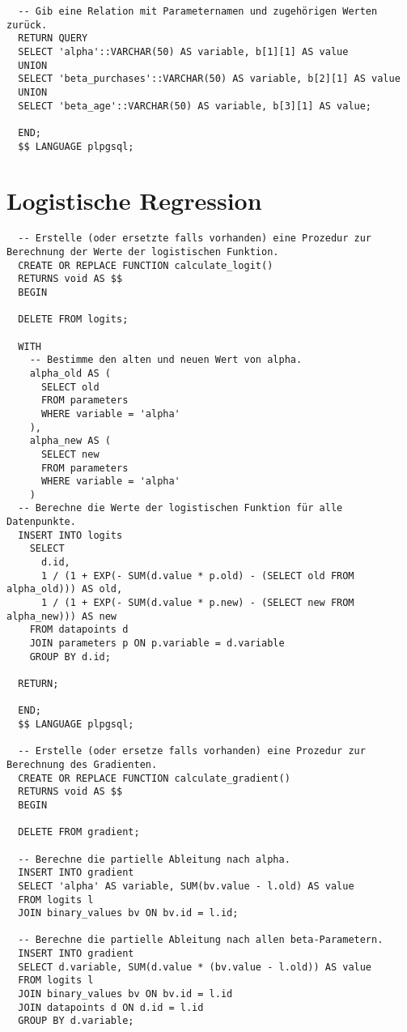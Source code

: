 \begin{verbatim}
  -- Gib eine Relation mit Parameternamen und zugehörigen Werten zurück.
  RETURN QUERY
  SELECT 'alpha'::VARCHAR(50) AS variable, b[1][1] AS value
  UNION
  SELECT 'beta_purchases'::VARCHAR(50) AS variable, b[2][1] AS value
  UNION
  SELECT 'beta_age'::VARCHAR(50) AS variable, b[3][1] AS value;

  END;
  $$ LANGUAGE plpgsql;
\end{verbatim}

\section{Logistische Regression}
\label{appendix:E:3}

\begin{verbatim}
  -- Erstelle (oder ersetzte falls vorhanden) eine Prozedur zur Berechnung der Werte der logistischen Funktion.
  CREATE OR REPLACE FUNCTION calculate_logit()
  RETURNS void AS $$
  BEGIN

  DELETE FROM logits;

  WITH
    -- Bestimme den alten und neuen Wert von alpha.
    alpha_old AS (
      SELECT old
      FROM parameters
      WHERE variable = 'alpha'
    ),
    alpha_new AS (
      SELECT new
      FROM parameters
      WHERE variable = 'alpha'
    )
  -- Berechne die Werte der logistischen Funktion für alle Datenpunkte.
  INSERT INTO logits
    SELECT
      d.id,
      1 / (1 + EXP(- SUM(d.value * p.old) - (SELECT old FROM alpha_old))) AS old,
      1 / (1 + EXP(- SUM(d.value * p.new) - (SELECT new FROM alpha_new))) AS new
    FROM datapoints d
    JOIN parameters p ON p.variable = d.variable
    GROUP BY d.id;

  RETURN;

  END;
  $$ LANGUAGE plpgsql;

  -- Erstelle (oder ersetze falls vorhanden) eine Prozedur zur Berechnung des Gradienten.
  CREATE OR REPLACE FUNCTION calculate_gradient()
  RETURNS void AS $$
  BEGIN

  DELETE FROM gradient;

  -- Berechne die partielle Ableitung nach alpha.
  INSERT INTO gradient
  SELECT 'alpha' AS variable, SUM(bv.value - l.old) AS value
  FROM logits l
  JOIN binary_values bv ON bv.id = l.id;

  -- Berechne die partielle Ableitung nach allen beta-Parametern.
  INSERT INTO gradient
  SELECT d.variable, SUM(d.value * (bv.value - l.old)) AS value
  FROM logits l
  JOIN binary_values bv ON bv.id = l.id
  JOIN datapoints d ON d.id = l.id
  GROUP BY d.variable;


\end{verbatim}
